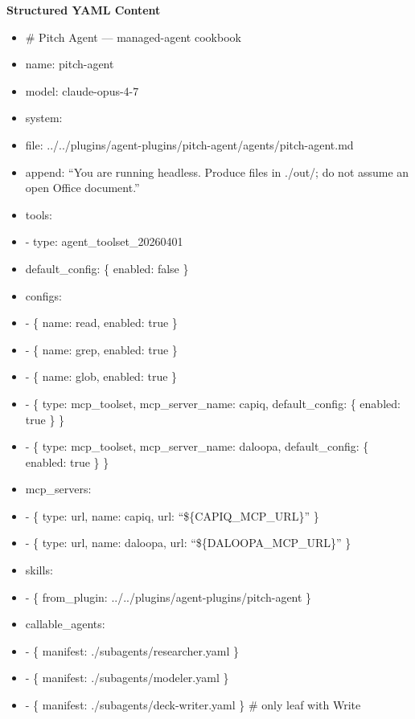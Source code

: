 \documentclass[11pt]{article}
\begin{document}
\textbf{Structured YAML Content}
\begin{itemize}[leftmargin=*,itemsep=2pt,topsep=2pt]
\item {} \# Pitch Agent — managed-agent cookbook
\item {} name: pitch-agent
\item {} model: claude-opus-4-7
\item {} system:
\item {} file: ../../plugins/agent-plugins/pitch-agent/agents/pitch-agent.md
\item {} append: ``You are running headless. Produce files in ./out/; do not assume an open Office document.''
\item {} tools:
\item {} - type: agent\_\allowbreak{}toolset\_\allowbreak{}20260401
\item {} default\_\allowbreak{}config: \{ enabled: false \}
\item {} configs:
\item {} - \{ name: read, enabled: true \}
\item {} - \{ name: grep, enabled: true \}
\item {} - \{ name: glob, enabled: true \}
\item {} - \{ type: mcp\_\allowbreak{}toolset, mcp\_\allowbreak{}server\_\allowbreak{}name: capiq, default\_\allowbreak{}config: \{ enabled: true \} \}
\item {} - \{ type: mcp\_\allowbreak{}toolset, mcp\_\allowbreak{}server\_\allowbreak{}name: daloopa, default\_\allowbreak{}config: \{ enabled: true \} \}
\item {} mcp\_\allowbreak{}servers:
\item {} - \{ type: url, name: capiq, url: ``\$\{CAPIQ\_\allowbreak{}MCP\_\allowbreak{}URL\}'' \}
\item {} - \{ type: url, name: daloopa, url: ``\$\{DALOOPA\_\allowbreak{}MCP\_\allowbreak{}URL\}'' \}
\item {} skills:
\item {} - \{ from\_\allowbreak{}plugin: ../../plugins/agent-plugins/pitch-agent \}
\item {} callable\_\allowbreak{}agents:
\item {} - \{ manifest: ./subagents/researcher.yaml \}
\item {} - \{ manifest: ./subagents/modeler.yaml \}
\item {} - \{ manifest: ./subagents/deck-writer.yaml \} \# only leaf with Write
\end{itemize}
\end{document}
